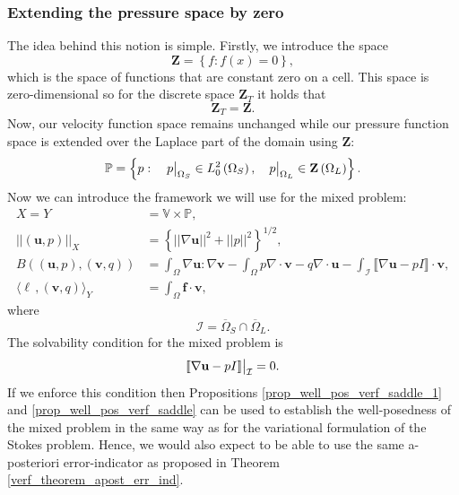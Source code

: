 \documentclass[12pt,a4paper]{article}
\theoremstyle{definition}
\newcommand\restr[2]{{%
		\left.\kern-\nulldelimiterspace %
		#1 %
		\vphantom{\big|} %
		\right|_{#2} %
}}
\begin{document}
\subsubsection{Extending the pressure space by zero}
The idea behind this notion is simple.  Firstly, we introduce the space  
\begin{equation}
\textbf{Z}=\left\lbrace  f: f\left(x\right)=0 \right\rbrace,
\end{equation}
which is the space of functions that are constant zero on a cell.  This space is zero-dimensional so for the discrete space $\textbf{Z}_T$ it holds that
\begin{equation}
\textbf{Z}_T=\textbf{Z}.\nonumber 
\end{equation}
 Now, our velocity function space remains unchanged while our pressure function space is extended over the Laplace part of the domain using $\textbf{Z}$:
\begin{equation}\label{extended_pressure_space}
\mathbb{P}=\left\lbrace p: \quad \restr{p}{{\Omega_S}}\in L^2_0\left(\Omega_S\right),\quad  \restr{p}{{\Omega_L}}\in\textbf{Z}\left(\Omega_L\right)\right\rbrace.
\end{equation}
Now we can introduce the framework we will use for the mixed problem:
\begin{equation}
\begin{aligned}
X=Y&=\mathbb{V}\times \mathbb{P},\\
\left|\left|\left(\textbf{u},p\right)\right|\right|_X&=\left\lbrace \left|\left|\nabla\textbf{u}\right|\right|^2 + \left|\left|p\right|\right|^2\right\rbrace^{1/2},\\
B\left(\left(\textbf{u},p\right),\left(\textbf{v},q\right)\right)&=\int_{\Omega}\nabla \textbf{u} : \nabla \textbf{v} - \int_{\Omega} p \nabla\cdot\textbf{v} -q \nabla\cdot\textbf{u}-\int_{\mathcal{I}} \llbracket\nabla\textbf{u}-pI\rrbracket\cdot\textbf{v},\\
\langle \ell\,,\left(\textbf{v},q\right) \rangle_Y &= \int_{\Omega}\textbf{f}\cdot \textbf{v},
\end{aligned}
\end{equation}
where 
\begin{equation}
\mathcal{I}=\overline{\Omega}_S\cap\overline{\Omega}_L.
\end{equation}
The solvability condition for the mixed problem is 
\begin{equation}
\restr{\llbracket\nabla\textbf{u}-pI\rrbracket}{\mathcal{I}}=0.
\end{equation}
If we enforce this condition then Propositions \ref{prop_well_pos_verf_saddle_1} and \ref{prop_well_pos_verf_saddle} can be used to establish the well-posedness of the mixed problem in the same way as for the variational formulation of the Stokes problem.   Hence, we would also expect to be able to use the same a-posteriori error-indicator as proposed in Theorem \ref{verf_theorem_apost_err_ind}.
\end{document}
